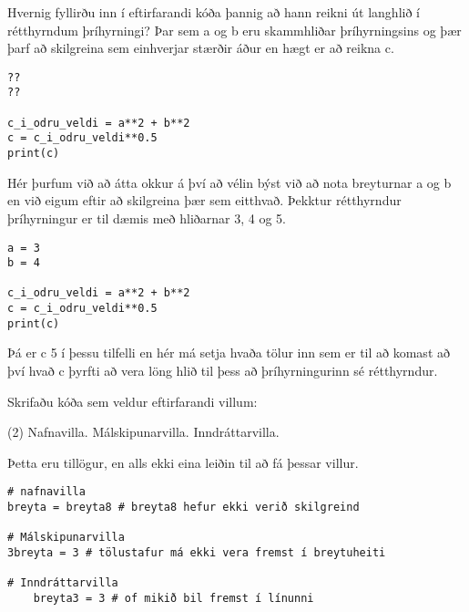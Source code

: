 \begin{exercise}\label{tol5}
	Hvernig fyllirðu inn í eftirfarandi kóða þannig að hann reikni út langhlið í rétthyrndum þríhyrningi?
	Þar sem a og b eru skammhliðar þríhyrningsins og þær þarf að skilgreina sem einhverjar stærðir áður en hægt er að reikna c.
\begin{lstlisting}
??
??

c_i_odru_veldi = a**2 + b**2
c = c_i_odru_veldi**0.5
print(c)\end{lstlisting}
\end{exercise}
\begin{Answer}[ref={tol5}]
	Hér þurfum við að átta okkur á því að vélin býst við að nota breyturnar a og b en við eigum eftir að skilgreina þær sem eitthvað.
	Þekktur rétthyrndur þríhyrningur er til dæmis með hliðarnar 3, 4 og 5.
\begin{lstlisting}
a = 3
b = 4

c_i_odru_veldi = a**2 + b**2
c = c_i_odru_veldi**0.5
print(c)\end{lstlisting}
	Þá er c 5 í þessu tilfelli en hér má setja hvaða tölur inn sem er til að komast að því hvað c þyrfti að vera löng hlið til þess að þríhyrningurinn sé rétthyrndur.
\end{Answer}

\begin{exercise}\label{tol-villa}
	Skrifaðu kóða sem veldur eftirfarandi villum:
	\begin{tasks}(2)
		\task\label{tol-villa1} Nafnavilla.  
		\task\label{tol-villa2} Málskipunarvilla.
		\task\label{tol-villa3} Inndráttarvilla.
	\end{tasks}
\end{exercise}
\begin{Answer}[ref={tol-villa}]
	Þetta eru tillögur, en alls ekki eina leiðin til að fá þessar villur.
\begin{lstlisting}
# nafnavilla
breyta = breyta8 # breyta8 hefur ekki verið skilgreind

# Málskipunarvilla
3breyta = 3 # tölustafur má ekki vera fremst í breytuheiti

# Inndráttarvilla
	breyta3 = 3 # of mikið bil fremst í línunni\end{lstlisting}
\end{Answer}